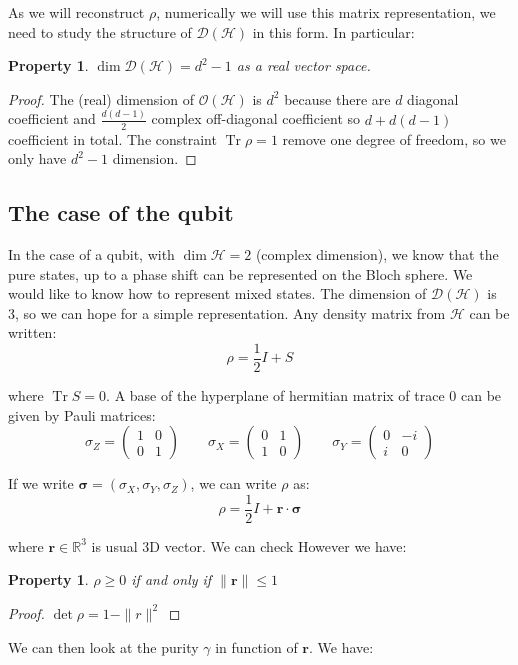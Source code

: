 \documentclass[10pt]{report}
\theoremstyle{plain}
\newtheorem{prop}[thm]{Property}
\theoremstyle{definition}
\theoremstyle{remark}
\newcommand{\R}{\ensuremath{\mathbb{R}}}
\renewcommand{\geq}{\geqslant}
\renewcommand{\leq}{\leqslant}
\newcommand{\mat}[1]{\begin{pmatrix}#1\end{pmatrix}}
\newcommand{\bs}{\boldsymbol}
\DeclareMathOperator{\Tr}{Tr}
\begin{document}
As we will reconstruct $\rho$, numerically we will use this matrix
representation, we need to study the structure of $\mathcal{D}(\mathcal{H})$ in
this form. In particular:

\begin{prop}
  $\dim \mathcal{D}(\mathcal{H}) = d^2 - 1 $ as a real vector space.
\end{prop}

\begin{proof}
  The (real) dimension of $\mathcal{O}(\mathcal{H})$ is $d^2$ because there are $d$ diagonal
  coefficient and $\frac {d(d-1)} 2$ complex off-diagonal coefficient so $d +
  d(d-1)$ coefficient in total. The constraint $\Tr \rho = 1$ remove one degree
  of freedom, so we only have $d^2 -1$ dimension.
\end{proof}

\subsection{The case of the qubit}

In the case of a qubit, with $\dim \mathcal{H} = 2$ (complex dimension), we know
that the pure states, up to a phase shift can be represented on the Bloch sphere. We
would like to know how to represent mixed states. The dimension of
$\mathcal{D}(\mathcal{H})$ is 3, so we can hope for a simple representation. Any
density matrix from $\mathcal{H}$ can be written:
\[\rho = \frac12I + S\]

where $\Tr S = 0$. A base of the hyperplane of hermitian matrix of trace $0$ can
be given by Pauli matrices:
\[\sigma_Z = \mat{1&0\\0&1} \quad \quad \sigma_X = \mat{0&1\\1&0} \quad \quad
  \sigma_Y = \mat{0&-i\\i&0}\]

If we write $\bs\sigma = (\sigma_X,\sigma_Y,\sigma_Z)$, we can write
$\rho$ as:
\[\rho = \frac12 I + \bs r \cdot \bs \sigma\]

where $\bs r \in \R^3$ is usual 3D vector. We can check  However we have:

\begin{prop}
  $\rho \geq 0$ if and only if $\|\bs r\| \leq 1$
\end{prop}

\begin{proof}
  $\det \rho = 1 - \|r\|^2$
\end{proof}

We can then look at the purity $\gamma$ in function of $\bs r$. We have:
\end{document}
